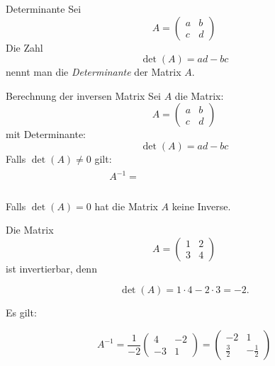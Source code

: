 \begin{definition}
    {Determinante}{}
    Sei $$A= \begin{pmatrix}
        a & b \\ c & d
    \end{pmatrix}$$
    Die Zahl 
    $$ \det(A) = ad-bc$$
    nennt man die \emph{Determinante} der Matrix $A$.
\end{definition}

\begin{satz}
    {Berechnung der inversen Matrix}{}
    Sei \( A \) die Matrix:
    $$A= \begin{pmatrix}
        a & b \\ c & d
    \end{pmatrix}$$
    mit Determinante:
    $$ \det(A) = ad-bc$$
    Falls \( \det(A) \neq 0 \) gilt:
    \[
    A^{-1} = \phantom{\frac{1}{\det(A)}
    \begin{pmatrix} a_{22} & -a_{12} \\ -a_{21} & a_{11} \end{pmatrix}}
    \]

    Falls \( \det(A) = 0 \) hat die Matrix \( A \) keine Inverse.

\end{satz}
\begin{bsp}
    {}{}
    Die Matrix 
\[
A =
\begin{pmatrix} 1 & 2 \\ 3 & 4 \end{pmatrix}
\]
ist invertierbar, denn 

\[
\det(A) = 1 \cdot 4 - 2 \cdot 3 = -2.
\]

Es gilt:

\[
A^{-1} = \frac{1}{-2} 
\begin{pmatrix} 4 & -2 \\ -3 & 1 \end{pmatrix}
=
\begin{pmatrix} -2 & 1 \\ \frac{3}{2} & -\frac{1}{2} \end{pmatrix}
\]

\end{bsp}

